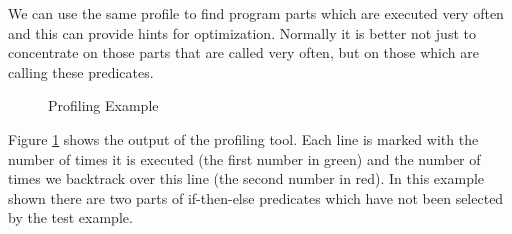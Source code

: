 \documentclass[a4paper,12pt]{report}
\begin{document}
We can use the same profile to find program parts which are executed very often and this can provide hints for optimization. Normally it is better not just to concentrate on those parts that are called very often, but on those which are calling these predicates. 

\begin{figure}[thbp]
\begin{center}
\end{center}
\caption{\label{Profiling}Profiling Example}
\end{figure}

Figure \ref{Profiling} shows the output of the profiling tool. Each line is marked with the number of times it is executed (the first number in green) and the number of times we backtrack over this line (the second number in red). In this example shown there are two parts of if-then-else predicates which have not been selected by the test example.
\end{document}
